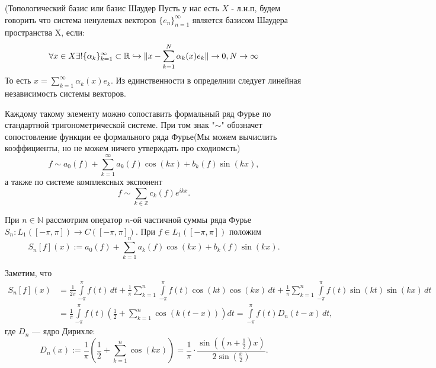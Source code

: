 \begin{definition}
    (Топологический базис или базис Шаудер    Пусть у нас есть $X$ - л.н.п, будем говорить что система ненулевых векторов $\{e_n\}_{n=1}^{\infty}$ является базисом Шаудера пространства X, если:
    \[
    \forall x \in X \exists! \{\alpha_k\}_{k=1}^{\infty} \subset \mathbb{R} \hookrightarrow \| x - \sum_{k=1}^{N} \alpha_k(x) e_k\| \to 0, N \to \infty
    \]
    То есть $x = \sum\limits_{k=1}^{\infty} \alpha_k(x) e_k$. Из единственности в определнии следует линейная независимость системы векторов.
\end{definition}

\begin{proposition}
    Каждому такому элементу можно сопоставить формальный ряд Фурье по стандартной тригонометрической системе. При том знак "$\sim$" обозначет сопостовление функции ее формального ряда Фурье(Мы можем вычислить коэффициенты, но не можем ничего утверждать про сходиомсть)
$$
f \sim a_{0}(f)+\sum\limits_{k=1}^{\infty}a_{k}(f)\cos(kx) + b_{k}(f)\sin(kx),
$$
а также по системе комплексных экспонент
$$
f \sim \sum\limits_{k \in \mathbb{Z}}c_{k}(f)e^{ikx}.
$$

При $n \in \mathbb{N}$ рассмотрим оператор $n$-ой частичной суммы ряда Фурье $S_{n}:L_{1}([-\pi,\pi]) \to C([-\pi,\pi])$. При $f \in L_{1}([-\pi,\pi])$ положим
$$
S_{n}[f](x):=a_{0}(f)+\sum\limits_{k=1}^{n}a_{k}(f)\cos(kx) + b_{k}(f)\sin(kx).
$$
\end{proposition}

Заметим, что
\begin{equation}
\label{eqq.6}
\begin{split}
S_n[f](x) &= \frac{1}{2\pi} \int\limits_{-\pi}^{\pi} f(t)\,dt
+ \frac{1}{\pi} \sum\limits_{k=1}^{n} \int\limits_{-\pi}^{\pi} f(t) \cos(kt) \cos(kx)\,dt
+ \frac{1}{\pi} \sum\limits_{k=1}^{n} \int\limits_{-\pi}^{\pi} f(t) \sin(kt) \sin(kx)\,dt \\
&= \frac{1}{\pi} \int\limits_{-\pi}^{\pi} f(t) \left( \frac{1}{2} + \sum\limits_{k=1}^{n} \cos(k(t - x)) \right) dt
= \int\limits_{-\pi}^{\pi} f(t) D_n(t - x)\,dt,
\end{split}
\end{equation}
где \( D_n \) — ядро Дирихле:
\begin{equation}
\label{eqq.7}
D_n(x) := \frac{1}{\pi} \left( \frac{1}{2} + \sum\limits_{k=1}^{n} \cos(kx) \right) = \frac{1}{\pi} \cdot \frac{\sin\left( \left(n + \frac{1}{2}\right) x \right)}{2 \sin\left( \frac{x}{2} \right)}.
\end{equation}


